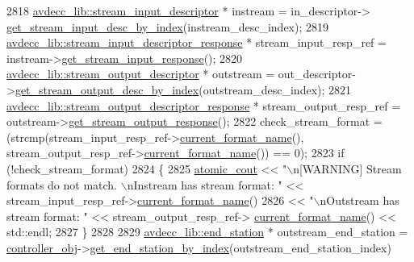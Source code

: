 \begin{DoxyCode}
2818         \hyperlink{classavdecc__lib_1_1stream__input__descriptor}{avdecc\_lib::stream\_input\_descriptor} * instream = in\_descriptor->
      \hyperlink{classavdecc__lib_1_1configuration__descriptor_a69cfe9032cea21937b4153878f8a925c}{get\_stream\_input\_desc\_by\_index}(instream\_desc\_index);
2819         \hyperlink{classavdecc__lib_1_1stream__input__descriptor__response}{avdecc\_lib::stream\_input\_descriptor\_response} * 
      stream\_input\_resp\_ref = instream->\hyperlink{classavdecc__lib_1_1stream__input__descriptor_a1be36084f46cee6b34b31b75e7667cc6}{get\_stream\_input\_response}();
2820         \hyperlink{classavdecc__lib_1_1stream__output__descriptor}{avdecc\_lib::stream\_output\_descriptor} * outstream = 
      out\_descriptor->\hyperlink{classavdecc__lib_1_1configuration__descriptor_a300ea5957342e2e9579318135da02856}{get\_stream\_output\_desc\_by\_index}(outstream\_desc\_index);
2821         \hyperlink{classavdecc__lib_1_1stream__output__descriptor__response}{avdecc\_lib::stream\_output\_descriptor\_response} * 
      stream\_output\_resp\_ref = outstream->\hyperlink{classavdecc__lib_1_1stream__output__descriptor_af92b70610c451a7f1eefcb71b3d97eb8}{get\_stream\_output\_response}();
2822         check\_stream\_format = (strcmp(stream\_input\_resp\_ref->\hyperlink{classavdecc__lib_1_1stream__input__descriptor__response_a24176b56bc0f1873b27d00565bc397c5}{current\_format\_name}(), 
      stream\_output\_resp\_ref->\hyperlink{classavdecc__lib_1_1stream__output__descriptor__response_a24176b56bc0f1873b27d00565bc397c5}{current\_format\_name}()) == 0);
2823         \textcolor{keywordflow}{if} (!check\_stream\_format)
2824         \{
2825             \hyperlink{cmd__line_8h_a0bc38ccc65c79ba06c6fcd7b4bf554c3}{atomic\_cout} << \textcolor{stringliteral}{"\(\backslash\)n[WARNING] Stream formats do not match. \(\backslash\)nInstream has stream
       format: "} << stream\_input\_resp\_ref->\hyperlink{classavdecc__lib_1_1stream__input__descriptor__response_a24176b56bc0f1873b27d00565bc397c5}{current\_format\_name}()
2826                         << \textcolor{stringliteral}{"\(\backslash\)nOutstream has stream format: "} << stream\_output\_resp\_ref->
      \hyperlink{classavdecc__lib_1_1stream__output__descriptor__response_a24176b56bc0f1873b27d00565bc397c5}{current\_format\_name}() << std::endl;
2827         \}
2828 
2829         \hyperlink{classavdecc__lib_1_1end__station}{avdecc\_lib::end\_station} * outstream\_end\_station = 
      \hyperlink{classcmd__line_af0a7784509e5bf1210a2aa19cea5df70}{controller\_obj}->\hyperlink{classavdecc__lib_1_1controller_a2a8ec1205ea0d5fdd6f833285257d0d0}{get\_end\_station\_by\_index}(outstream\_end\_station\_index)

\end{DoxyCode}
